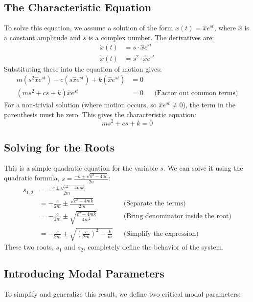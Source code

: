\documentclass{article}
\begin{document}
\subsection{The Characteristic Equation}
To solve this equation, we assume a solution of the form $x(t) = \hat{x}e^{st}$, where $\hat{x}$ is a constant amplitude and $s$ is a complex number. The derivatives are:
\begin{align*}
    \dot{x}(t) &= s \cdot \hat{x}e^{st} \\
    \ddot{x}(t) &= s^2 \cdot \hat{x}e^{st}
\end{align*}
Substituting these into the equation of motion gives:
\begin{align*}
    m(s^2 \hat{x}e^{st}) + c(s \hat{x}e^{st}) + k(\hat{x}e^{st}) &= 0 \\
    (ms^2 + cs + k)\hat{x}e^{st} &= 0 && \text{(Factor out common terms)}
\end{align*}
For a non-trivial solution (where motion occurs, so $\hat{x}e^{st} \neq 0$), the term in the parenthesis must be zero. This gives the characteristic equation:
\begin{equation}
    ms^2 + cs + k = 0
\end{equation}

\subsection{Solving for the Roots}
This is a simple quadratic equation for the variable $s$. We can solve it using the quadratic formula, $s = \frac{-b \pm \sqrt{b^2 - 4ac}}{2a}$:
\begin{align}
    s_{1,2} &= \frac{-c \pm \sqrt{c^2 - 4mk}}{2m} \\
    &= -\frac{c}{2m} \pm \frac{\sqrt{c^2 - 4mk}}{2m} && \text{(Separate the terms)} \\
    &= -\frac{c}{2m} \pm \sqrt{\frac{c^2 - 4mk}{4m^2}} && \text{(Bring denominator inside the root)} \\
    &= -\frac{c}{2m} \pm \sqrt{\left(\frac{c}{2m}\right)^2 - \frac{k}{m}} && \text{(Simplify the expression)}
\end{align}
These two roots, $s_1$ and $s_2$, completely define the behavior of the system.

\subsection{Introducing Modal Parameters}
To simplify and generalize this result, we define two critical modal parameters:
\end{document}
